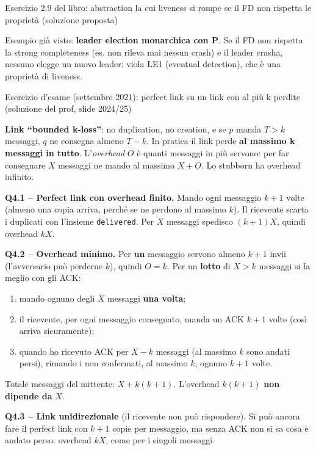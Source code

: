 \begin{approfondimento}{Esercizio 2.9 del libro: abstraction la cui liveness si rompe se il FD
non rispetta le proprietà (soluzione proposta)}

Esempio già visto: \textbf{leader election monarchica con P}. Se il FD non rispetta la strong completeness (es. non rileva mai nessun crash) e il leader crasha, nessuno elegge un nuovo leader: viola LE1 (eventual detection), che è una proprietà di liveness.

\end{approfondimento}

\begin{approfondimento}{Esercizio d'esame (settembre 2021): perfect link su un link con al più k
perdite (soluzione del prof, slide 2024/25)}

\textbf{Link ``bounded k-loss''}: no duplication, no creation, e se \(p\) manda \(T > k\) messaggi, \(q\) ne consegna almeno \(T - k\). In pratica il link perde \textbf{al massimo k messaggi in tutto}. L'\emph{overhead} \(O\) è quanti messaggi in più servono: per far consegnare \(X\) messaggi ne mando al massimo \(X + O\). Lo stubborn ha overhead infinito.

\textbf{Q4.1 -- Perfect link con overhead finito.} Mando ogni messaggio \(k+1\) volte (almeno una copia arriva, perché se ne perdono al massimo \(k\)). Il ricevente scarta i duplicati con l'insieme \texttt{delivered}. Per \(X\) messaggi spedisco \((k+1)X\), quindi overhead \(kX\).

\textbf{Q4.2 -- Overhead minimo.} Per \textbf{un} messaggio servono almeno \(k+1\) invii (l'avversario può perderne \(k\)), quindi \(O = k\). Per un \textbf{lotto} di \(X > k\) messaggi si fa meglio con gli ACK:

\begin{enumerate}
\def\labelenumi{\arabic{enumi}.}
\tightlist
\item
  mando ognuno degli \(X\) messaggi \textbf{una volta};
\item
  il ricevente, per ogni messaggio consegnato, manda un ACK \(k+1\) volte (così arriva sicuramente);
\item
  quando ho ricevuto ACK per \(X - k\) messaggi (al massimo \(k\) sono andati persi), rimando i non confermati, al massimo \(k\), ognuno \(k+1\) volte.
\end{enumerate}

Totale messaggi del mittente: \(X + k(k+1)\). L'overhead \(k(k+1)\) \textbf{non dipende da} \(X\).

\textbf{Q4.3 -- Link unidirezionale} (il ricevente non può rispondere). Si può ancora fare il perfect link con \(k+1\) copie per messaggio, ma senza ACK non si sa cosa è andato perso: overhead \(kX\), come per i singoli messaggi.

\end{approfondimento}


